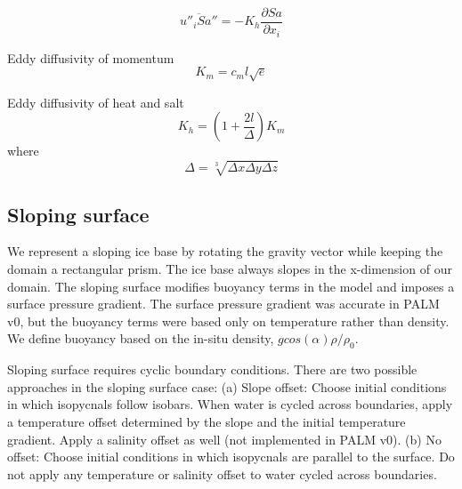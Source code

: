 \documentclass[letterpaper,10pt]{report}
\begin{document}
	\begin{equation} \label{eq:sadiff}
	\overline{u''_i Sa''} = -K_h \frac{\partial Sa}{\partial x_i}
	\end{equation}
	
	Eddy diffusivity of momentum
	\begin{equation} \label{eq:Km}
	K_m = c_m l \sqrt{e}
	\end{equation}

	Eddy diffusivity of heat and salt
	\begin{equation} \label{eq:Kh}
	K_h = (1+\frac{2l}{\Delta})K_m
	\end{equation}
    where
	\begin{equation} \label{eq:gridl}
	\Delta = \sqrt[3]{\Delta x \Delta y \Delta z}
	\end{equation}
	
	\newpage
	\subsection{Sloping surface}
	We represent a sloping ice base by rotating the gravity vector while keeping the domain a rectangular prism. The ice base always slopes in the x-dimension of our domain. The sloping surface modifies buoyancy terms in the model and imposes a surface pressure gradient. The surface pressure gradient was accurate in PALM v0, but the buoyancy terms were based only on temperature rather than density. We define buoyancy based on the in-situ density, $g cos(\alpha) \rho/\rho_0$.
		
	Sloping surface requires cyclic boundary conditions. There are two possible approaches in the sloping surface case:
	(a) Slope offset: Choose initial conditions in which isopycnals follow isobars. When water is cycled across boundaries, apply a temperature offset determined by the slope and the initial temperature gradient. Apply a salinity offset as well (not implemented in PALM v0).
	(b) No offset: Choose initial conditions in which isopycnals are parallel to the surface. Do not apply any temperature or salinity offset to water cycled across boundaries.  
	
\end{document}
